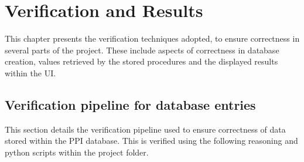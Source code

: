\documentclass[msc,deptreport,ai]{infthesis}      %
\begin{document}
\chapter{Verification and Results}
This chapter presents the verification techniques adopted, to ensure correctness in several parts of the project. These include aspects of correctness in database creation, values retrieved by the stored procedures and the displayed results within the UI. 
\section{Verification pipeline for database entries}
This section details the verification pipeline used to ensure correctness of data stored within the PPI database. This is verified using the following reasoning and python scripts within the project folder.
\end{document}
